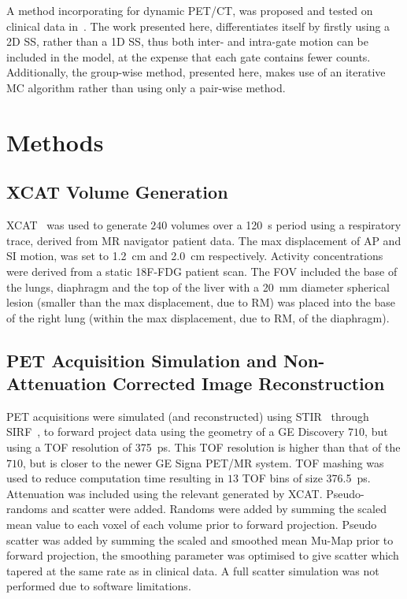     A method incorporating  for dynamic \gls{PET}/\gls{CT}, was proposed and tested on clinical data in~\cite{Chan2018Non-RigidPET}. The work presented here, differentiates itself by firstly using a \gls{2D} \gls{SS}, rather than a \gls{1D} \gls{SS}, thus both inter- and intra-gate motion can be included in the model, at the expense that each gate contains fewer counts. Additionally, the group-wise method, presented here, makes use of an iterative \gls{MC} algorithm rather than using only a pair-wise method.


\section{Methods} \label{sec:methods}
    \subsection{XCAT Volume Generation} \label{sec:xcat_volume_generation}
        \gls{XCAT}~\cite{Segars2010} was used to generate $240$ volumes over a \SI{120}{\second} period using a respiratory trace, derived from \gls{MR} navigator patient data. The max displacement of \acrlong{AP} and \acrlong{SI} motion, was set to \SI{1.2}{\centi\metre} and \SI{2.0}{\centi\metre} respectively. Activity concentrations were derived from a static \gls{18F-FDG} patient scan. The \gls{FOV} included the base of the lungs, diaphragm and the top of the liver with a \SI{20}{\milli\metre} diameter spherical lesion (smaller than the max displacement, due to \gls{RM}) was placed into the base of the right lung (within the max displacement, due to \gls{RM}, of the diaphragm).
    
    
    \subsection{PET Acquisition Simulation and Non-Attenuation Corrected Image Reconstruction} \label{sec:pet_acquisition_simulation_and_non_attenuation_corrected_image_reconstruction}
        \gls{PET} acquisitions were simulated (and reconstructed) using \gls{STIR}~\cite{Thielemans2012, Nikos2019} through \gls{SIRF}~\cite{Ovtchinnikov2017}, to forward project data using the geometry of a \gls{GE} Discovery $710$, but using a \gls{TOF} resolution of \SI{375}{\pico\second}. This \gls{TOF} resolution is higher than that of the $710$, but is closer to the newer \gls{GE} Signa \gls{PET}/\gls{MR} system. \gls{TOF} mashing was used to reduce computation time resulting in $13$ \gls{TOF} bins of size \SI{376.5}{\pico\second}. Attenuation was included using the relevant  generated by \gls{XCAT}. Pseudo-randoms and scatter were added. Randoms were added by summing the scaled mean value to each voxel of each volume prior to forward projection. Pseudo scatter was added by summing the scaled and smoothed mean \gls{Mu-Map} prior to forward projection, the smoothing parameter was optimised to give scatter which tapered at the same rate as in clinical data. A full scatter simulation was not performed due to software limitations.
        
